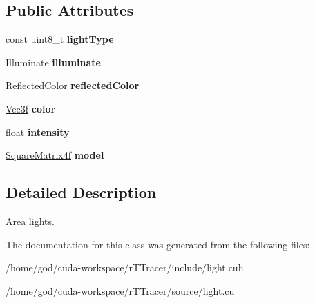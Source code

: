 \subsection*{Public Attributes}
\begin{DoxyCompactItemize}
\item 
const uint8\+\_\+t {\bfseries light\+Type}\hypertarget{class_i_light_a592b1197728a9b0ca9628f34856cff45}{}\label{class_i_light_a592b1197728a9b0ca9628f34856cff45}

\item 
Illuminate {\bfseries illuminate}\hypertarget{class_i_light_ad5ad27cccb6e7826692fac29537d076f}{}\label{class_i_light_ad5ad27cccb6e7826692fac29537d076f}

\item 
Reflected\+Color {\bfseries reflected\+Color}\hypertarget{class_i_light_a95817a159b6785ce2a4c6173fff682a6}{}\label{class_i_light_a95817a159b6785ce2a4c6173fff682a6}

\item 
\hyperlink{class_vec3}{Vec3f} {\bfseries color}\hypertarget{class_i_light_a539825d74cc014ecbc4b4d9fdea4373a}{}\label{class_i_light_a539825d74cc014ecbc4b4d9fdea4373a}

\item 
float {\bfseries intensity}\hypertarget{class_i_light_a91736d3b866f370017c3d409dee239ef}{}\label{class_i_light_a91736d3b866f370017c3d409dee239ef}

\item 
\hyperlink{class_square_matrix4}{Square\+Matrix4f} {\bfseries model}\hypertarget{class_i_light_ae508549f5ec5b492c5f1a19df37e792b}{}\label{class_i_light_ae508549f5ec5b492c5f1a19df37e792b}

\end{DoxyCompactItemize}


\subsection{Detailed Description}
Area lights. 

The documentation for this class was generated from the following files\+:\begin{DoxyCompactItemize}
\item 
/home/god/cuda-\/workspace/r\+T\+Tracer/include/light.\+cuh\item 
/home/god/cuda-\/workspace/r\+T\+Tracer/source/light.\+cu\end{DoxyCompactItemize}
